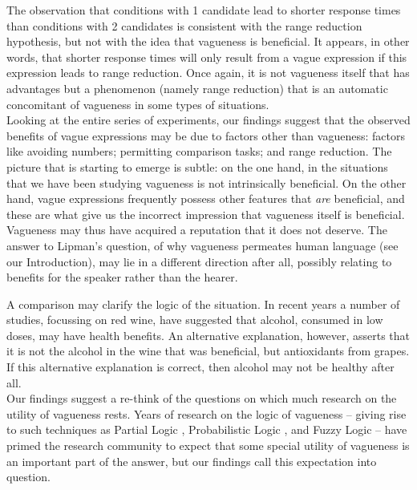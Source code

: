 The observation that conditions with 1 candidate lead to shorter response times than conditions with 2 candidates is consistent with the range reduction hypothesis, but not with the idea that vagueness is beneficial. It appears, in other words, that shorter response times will only result from a vague expression if this expression leads to range reduction. Once again, it is not vagueness itself that has advantages but a phenomenon (namely range reduction) that is an automatic concomitant of vagueness in some types of situations.\\[2ex]
%
\noindent Looking at the entire series of experiments, our findings suggest that the observed benefits of vague expressions may be due to factors other than vagueness: factors like avoiding numbers; permitting comparison tasks; and range reduction. The picture that is starting to emerge is subtle: on the one hand, in the situations that we have been studying vagueness is not intrinsically beneficial. On the other hand, vague expressions frequently possess other features that \emph{are} beneficial, and these are what give us the incorrect impression that vagueness itself is beneficial. Vagueness may thus have acquired a reputation that it does not deserve. The answer to Lipman's question, of why vagueness permeates human language (see our Introduction), may lie in a different direction after all, possibly relating to benefits for the speaker rather than the hearer.

A comparison may clarify the logic of the situation. In recent years a number of studies, focussing on red wine, have suggested that alcohol, consumed in low doses, may have health benefits. An alternative explanation, however, asserts that it is not the alcohol in the wine that was beneficial, but antioxidants from grapes. If this alternative explanation is correct, then alcohol may not be healthy after all.\\[2ex]
%
Our findings suggest a re-think of the questions on which much research on the utility of vagueness rests. Years of research on the logic of vagueness -- giving rise to such techniques as Partial Logic \citet[e.g.,]{Fine}, Probabilistic Logic \citet{Edgington}, and Fuzzy Logic \citet{Zadeh} -- have primed the research community to expect that some special utility of vagueness is an important part of the answer, but our findings call this expectation into question. 

